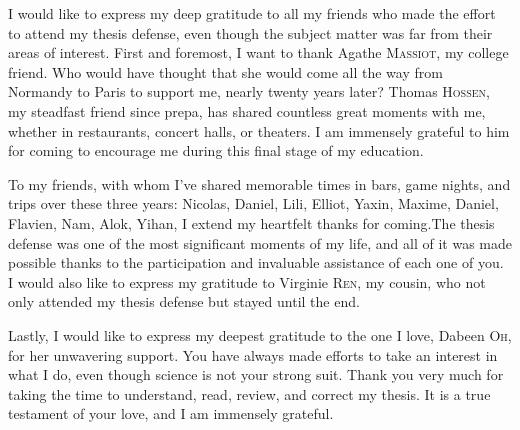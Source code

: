 \begin{otherlanguage}{english}
I would like to express my deep gratitude to all my friends who made the effort to attend my thesis defense, even though the subject matter was far from their areas of interest. First and foremost, I want to thank Agathe \textsc{Massiot}, my college friend. Who would have thought that she would come all the way from Normandy to Paris to support me, nearly twenty years later? Thomas \textsc{Hossen}, my steadfast friend since prepa, has shared countless great moments with me, whether in restaurants, concert halls, or theaters. I am immensely grateful to him for coming to encourage me during this final stage of my education.

To my friends, with whom I've shared memorable times in bars, game nights, and trips over these three years: Nicolas, Daniel, Lili, Elliot, Yaxin, Maxime, Daniel, Flavien, Nam, Alok, Yihan, I extend my heartfelt thanks for coming.The thesis defense was one of the most significant moments of my life, and all of it was made possible thanks to the participation and invaluable assistance of each one of you.
I would also like to express my gratitude to Virginie \textsc{Ren}, my cousin, who not only attended my thesis defense but stayed until the end. 

Lastly, I would like to express my deepest gratitude to the one I love, Dabeen \textsc{Oh}, for her unwavering support. You have always made efforts to take an interest in what I do, even though science is not your strong suit. Thank you very much for taking the time to understand, read, review, and correct my thesis. It is a true testament of your love, and I am immensely grateful.

\endgroup
\newpage
\cleardoublepage

%
%
%
%
%
%
%

\end{otherlanguage}
    